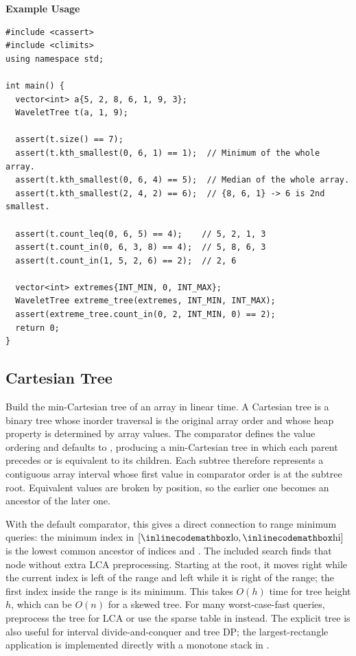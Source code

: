 \textbf{Example Usage}\par
\begin{lstlisting}[style=cpp]
#include <cassert>
#include <climits>
using namespace std;

int main() {
  vector<int> a{5, 2, 8, 6, 1, 9, 3};
  WaveletTree t(a, 1, 9);

  assert(t.size() == 7);
  assert(t.kth_smallest(0, 6, 1) == 1);  // Minimum of the whole array.
  assert(t.kth_smallest(0, 6, 4) == 5);  // Median of the whole array.
  assert(t.kth_smallest(2, 4, 2) == 6);  // {8, 6, 1} -> 6 is 2nd smallest.

  assert(t.count_leq(0, 6, 5) == 4);    // 5, 2, 1, 3
  assert(t.count_in(0, 6, 3, 8) == 4);  // 5, 8, 6, 3
  assert(t.count_in(1, 5, 2, 6) == 2);  // 2, 6

  vector<int> extremes{INT_MIN, 0, INT_MAX};
  WaveletTree extreme_tree(extremes, INT_MIN, INT_MAX);
  assert(extreme_tree.count_in(0, 2, INT_MIN, 0) == 2);
  return 0;
}
\end{lstlisting}
\subsection{Cartesian Tree}
\label{sec:2.5.14}
Build the min-Cartesian tree of an array in linear time. A Cartesian tree is a binary tree whose inorder traversal is the original array order and whose heap property is determined by array values. The comparator  defines the value ordering and defaults to , producing a min-Cartesian tree in which each parent precedes or is equivalent to its children. Each subtree therefore represents a contiguous array interval whose first value in comparator order is at the subtree root. Equivalent values are broken by position, so the earlier one becomes an ancestor of the later one.

With the default comparator, this gives a direct connection to range minimum queries: the minimum index in $[{\inlinecodemath{lo}}, {\inlinecodemath{hi}}]$ is the lowest common ancestor of indices  and . The included search finds that node without extra LCA preprocessing. Starting at the root, it moves right while the current index is left of the range and left while it is right of the range; the first index inside the range is its minimum. This takes $O(h)$ time for tree height $h$, which can be $O(n)$ for a skewed tree. For many worst-case-fast queries, preprocess the tree for LCA or use the sparse table in  instead. The explicit tree is also useful for interval divide-and-conquer and tree DP; the largest-rectangle application is implemented directly with a monotone stack in .

